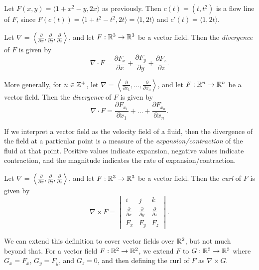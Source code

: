 \begin{exmp}
    Let $F(x, y) = \langle 1 + x^2 - y, 2x\rangle$ as previously. Then $c(t) = (t, t^2)$ is a flow line of $F$, since $F(c(t)) = \langle 1 + t^2 - t^2, 2t\rangle = \langle 1, 2t\rangle$ and $c'(t) = \langle 1, 2t\rangle$.
\end{exmp}

\begin{defn}
    Let $\nabla = \left\langle \frac{\partial}{\partial{x}}, \frac{\partial}{\partial{y}}, \frac{\partial}{\partial{z}} \right\rangle$, and let $F:\mathbb{R}^3 \to \mathbb{R}^3$ be a vector field. Then the \emph{divergence} of $F$ is given by \[\nabla \cdot F = \frac{\partial{F_x}}{\partial{x}} + \frac{\partial{F_y}}{\partial{y}} + \frac{\partial{F_z}}{\partial{z}}.\]
\end{defn}

\begin{defn}
    More generally, for $n \in \mathbb{Z}^+$, let $\nabla = \left\langle \frac{\partial}{\partial{x_1}}, \ldots, \frac{\partial}{\partial{x_n}} \right\rangle$, and let $F:\mathbb{R}^n \to \mathbb{R}^n$ be a vector field. Then the \emph{divergence} of $F$ is given by \[\nabla \cdot F = \frac{\partial{F_{x_1}}}{\partial{x_1}} + \ldots + \frac{\partial{F_{x_n}}}{\partial{x_n}}.\]
\end{defn}

\begin{rmk}
    If we interpret a vector field as the velocity field of a fluid, then the divergence of the field at a particular point is a measure of the \emph{expansion/contraction} of the fluid at that point. Positive values indicate expansion, negative values indicate contraction, and the magnitude indicates the rate of expansion/contraction.
\end{rmk}

\begin{defn}
    Let $\nabla = \left\langle \frac{\partial}{\partial{x}}, \frac{\partial}{\partial{y}}, \frac{\partial}{\partial{z}} \right\rangle$, and let $F:\mathbb{R}^3 \to \mathbb{R}^3$ be a vector field. Then the \emph{curl} of $F$ is given by \[\nabla \times F = \begin{vmatrix}
        i & j & k \\
        \frac{\partial}{\partial{x}} & \frac{\partial}{\partial{y}} & \frac{\partial}{\partial{z}} \\
        F_x & F_y & F_z
        \end{vmatrix}.\]
\end{defn}

\begin{defn}
    We can extend this definition to cover vector fields over $\mathbb{R}^2$, but not much beyond that. For a vector field $F: \mathbb{R}^2 \to \mathbb{R}^2$, we extend $F$ to $G: \mathbb{R}^3 \to \mathbb{R}^3$ where $G_x = F_x$, $G_y = F_y$, and $G_z = 0$, and then defining the curl of $F$ as $\nabla \times G$.
\end{defn}

